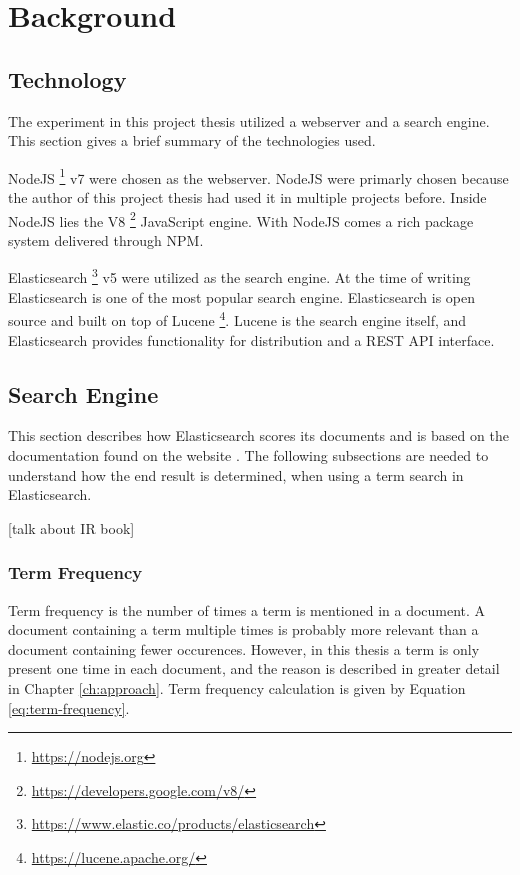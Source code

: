 \chapter{Background}
\label{ch:background}

\section{Technology}
The experiment in this project thesis utilized a webserver and a search engine.
This section gives a brief summary of the technologies used.

NodeJS \footnote{\url{https://nodejs.org}} v7 were chosen as the webserver.
NodeJS were primarly chosen because the author of this project thesis had used it in multiple projects before.
Inside NodeJS lies the V8 \footnote{\url{https://developers.google.com/v8/}} JavaScript engine.
With NodeJS comes a rich package system delivered through NPM.

Elasticsearch \footnote{\url{https://www.elastic.co/products/elasticsearch}} v5 were utilized as the search engine.
At the time of writing Elasticsearch is one of the most popular search engine.
Elasticsearch is open source and built on top of Lucene \footnote{\url{https://lucene.apache.org/}}.
Lucene is the search engine itself,
and Elasticsearch provides functionality for distribution and a REST API interface.

\section{Search Engine}
This section describes how Elasticsearch scores its documents and is based on the documentation found on the website \cite{elasticsearch-scoring}.
The following subsections are needed to understand how the end result is determined, when using a term search in Elasticsearch.

[talk about IR book] \cite{ir-book}

\subsection{Term Frequency}
Term frequency is the number of times a term is mentioned in a document.
A document containing a term multiple times is probably more relevant than a document containing fewer occurences.
However, in this thesis a term is only present one time in each document, and the reason is described in greater detail in Chapter \ref{ch:approach}.
Term frequency calculation is given by Equation \ref{eq:term-frequency}.

